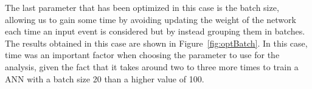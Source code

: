 \documentclass[a4paper, 10pt, openright]{report}
\begin{document}
\begin{appendices}
The last parameter that has been optimized in this case is the batch size, allowing us to gain some time by avoiding updating the weight of the network each time an input event is considered but by instead grouping them in batches. The results obtained in this case are shown in Figure~\ref{fig:optBatch}. In this case, time was an important factor when choosing the parameter to use for the analysis, given the fact that it takes around two to three more times to train a \ac{ANN} with a batch size 20 than a higher value of 100.



\end{appendices}
\end{document}
